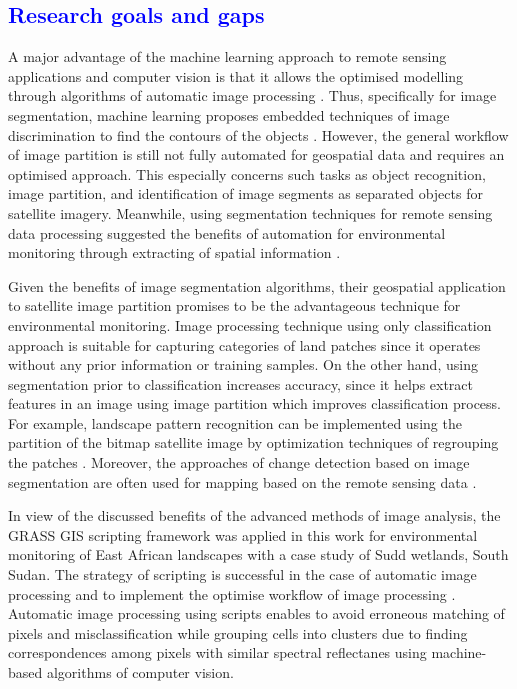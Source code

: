 \documentclass[analytics,article,submit,pdftex,moreauthors]{Definitions/mdpi}
\begin{document}
\subsection{\textcolor{blue}{Research goals and gaps}}
A major advantage of the machine learning approach to remote sensing applications and computer vision is that it allows the optimised modelling through algorithms of automatic image processing \cite{Yamashita,OLIVEIRA2020111830,Bauer,Onishi}. Thus, specifically for image segmentation, machine learning proposes embedded techniques of image discrimination to find the contours of the objects \cite{10073848,8402497,9113204}. However, the general workflow of image partition is still not fully automated for geospatial data and requires an optimised approach. This especially concerns such tasks as object recognition, image partition, and identification of image segments as separated objects for satellite imagery. Meanwhile, using segmentation techniques for remote sensing data processing suggested the benefits of automation for environmental monitoring through extracting of spatial information \cite{Colwell}. 

Given the benefits of image segmentation algorithms, their geospatial application to satellite image partition promises to be the advantageous technique for environmental monitoring. Image processing technique using only classification approach is suitable for capturing categories of land patches since it operates without any prior information or training samples. On the other hand, using segmentation prior to classification increases accuracy, since it helps extract features in an image using image partition which improves classification process. For example, landscape pattern recognition can be implemented using the partition of the bitmap satellite image by optimization techniques of regrouping the patches \cite{Lietal2017}. Moreover, the approaches of change detection based on image segmentation are often used for mapping based on the remote sensing data \cite{LeiNandi}. 

In view of the discussed benefits of the advanced methods of image analysis, the GRASS GIS scripting framework was applied in this work for environmental monitoring of East African landscapes with a case study of Sudd wetlands, South Sudan. The strategy of scripting is successful in the case of automatic image processing and to implement the optimise workflow of image processing \cite{Borcard,ijgi11090473}. Automatic image processing using scripts enables to avoid erroneous matching of pixels and misclassification while grouping cells into clusters due to finding correspondences among pixels with similar spectral reflectanes using machine-based algorithms of computer vision.
\end{document}
